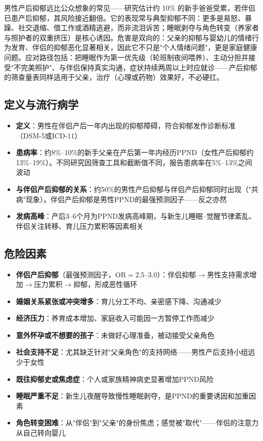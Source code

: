 \documentclass[12pt,a4paper,twoside]{ctexbook}
\begin{document}
男性产后抑郁远比公众想象的常见——研究估计约 10\% 的新手爸爸受累，若伴侣已患产后抑郁，其风险接近翻倍。它的表现常与典型抑郁不同：更多是易怒、暴躁、社交退缩、借工作或酒精逃避，而非流泪诉苦；睡眠剥夺与角色转变（养家者与照护者的双重挤压）是核心诱因。危害是双向的：父亲的抑郁与婴幼儿的情绪行为发育、伴侣的抑郁恶化显著相关，因此它不只是"个人情绪问题"，更是家庭健康问题。应对路径包括：把睡眠作为第一优先级（轮班制夜间喂养）、主动分担并接受"不完美照护"、与伴侣保持真实沟通，症状持续两周以上时应就诊——产后抑郁的筛查量表同样适用于父亲，治疗（心理或药物）效果好，不必硬扛。

\subsection{定义与流行病学}

\begin{itemize}[leftmargin=2cm]
	\item \textbf{定义}：男性在伴侣产后一年内出现的抑郁障碍，符合抑郁发作诊断标准（DSM-5或ICD-11）
	\item \textbf{患病率}：约8\%--10\%的新手父亲在产后第一年内经历PPND（女性产后抑郁约13\%--19\%）。不同研究因筛查工具和截断值不同，报告患病率在5\%--13\%之间波动
	\item \textbf{与伴侣产后抑郁的关系}：约50\%的男性产后抑郁与伴侣产后抑郁同时出现（"共病"现象）。伴侣产后抑郁是男性PPND的最强预测因子——反之亦然
	\item \textbf{发病高峰}：产后3--6个月为PPND发病高峰期，与新生儿睡眠--觉醒节律紊乱、伴侣关注转移、育儿压力累积等因素相关
\end{itemize}

\subsection{危险因素}

\begin{itemize}[leftmargin=2cm]
	\item \textbf{伴侣产后抑郁}（最强预测因子，OR$=2.5$--3.0）：伴侣抑郁$\rightarrow$男性支持需求增加$\rightarrow$压力累积$\rightarrow$抑郁，形成恶性循环
	\item \textbf{婚姻关系紧张或冲突增多}：育儿分工不均、亲密感下降、沟通减少
	\item \textbf{经济压力}：养育成本增加、家庭收入可能因一方暂停工作而减少
	\item \textbf{意外怀孕或不想要的孩子}：未做好心理准备，被动接受父亲角色
	\item \textbf{社会支持不足}：尤其缺乏针对"父亲角色"的支持网络——男性产后支持小组远少于女性
	\item \textbf{既往抑郁史或焦虑症}：个人或家族精神病史显著增加PPND风险
	\item \textbf{睡眠严重不足}：新生儿夜醒导致慢性睡眠剥夺，是PPND的重要诱因和加重因素
	\item \textbf{角色转变困难}：从"伴侣"到"父亲"的身份焦虑；感觉被"取代"——伴侣的注意力从自己转向婴儿
\end{itemize}
\end{document}
